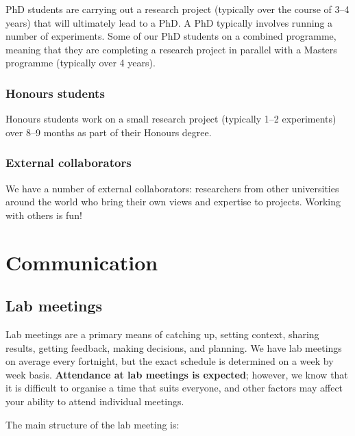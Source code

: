 \documentclass[]{book}
\theoremstyle{definition}
\theoremstyle{definition}
\theoremstyle{definition}
\theoremstyle{remark}
\begin{document}
PhD students are carrying out a research project (typically over the
course of 3--4 years) that will ultimately lead to a PhD. A PhD
typically involves running a number of experiments. Some of our PhD
students on a combined programme, meaning that they are completing a
research project in parallel with a Masters programme (typically over 4
years).

\hypertarget{honours-students}{%
\subsection{Honours students}\label{honours-students}}

Honours students work on a small research project (typically 1--2
experiments) over 8--9 months as part of their Honours degree.

\hypertarget{external-collaborators}{%
\subsection{External collaborators}\label{external-collaborators}}

We have a number of external collaborators: researchers from other
universities around the world who bring their own views and expertise to
projects. Working with others is fun!

\hypertarget{communication}{%
\chapter{Communication}\label{communication}}

\hypertarget{lab-meetings}{%
\section{Lab meetings}\label{lab-meetings}}

Lab meetings are a primary means of catching up, setting context,
sharing results, getting feedback, making decisions, and planning. We
have lab meetings on average every fortnight, but the exact schedule is
determined on a week by week basis. \textbf{Attendance at lab meetings
is expected}; however, we know that it is difficult to organise a time
that suits everyone, and other factors may affect your ability to attend
individual meetings.

The main structure of the lab meeting is:
\end{document}
